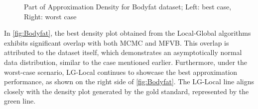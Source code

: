 \begin{figure}[h]
\begin{subfigure}{0.5\textwidth}
	\end{subfigure}
	\caption{Part of Approximation Density for Bodyfat dataset; Left: best case, Right: worst case}
	\label{fig:Bodyfat}
\end{figure}

In \autoref{fig:Bodyfat}, the best density plot obtained from the Local-Global algorithms exhibits significant overlap with both MCMC and MFVB. This overlap is attributed to the dataset itself, which demonstrates an asymptotically normal data distribution, similar to the case mentioned earlier. Furthermore, under the worst-case scenario, LG-Local continues to showcase the best approximation performance, as shown on the right side of \autoref{fig:Bodyfat}. The LG-Local line aligns closely with the density plot generated by the gold standard, represented by the green line.


